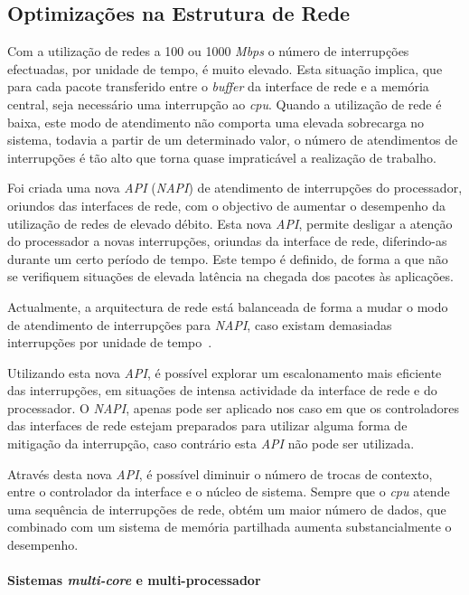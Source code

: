 \subsection{Optimizações na Estrutura de Rede}
\label{sub:napi}
Com a utilização de redes a 100 ou 1000 \textit{Mbps} o número de interrupções efectuadas, por unidade de tempo, é muito elevado.
Esta situação implica, que para cada pacote transferido entre o \textit{buffer} da interface de rede e a memória central, seja necessário uma interrupção ao \textit{cpu}.
Quando a utilização de rede é baixa, este modo de atendimento não comporta uma elevada sobrecarga no sistema, todavia a partir de um determinado valor, o número de atendimentos de interrupções é tão alto que torna quase impraticável a realização de trabalho.

Foi criada uma nova \textit{API} (\textit{NAPI}) de atendimento de interrupções do processador, oriundos das interfaces de rede, com o objectivo de aumentar o desempenho da utilização de redes de elevado débito.
Esta nova \textit{API}, permite desligar a atenção do processador a novas interrupções, oriundas da interface de rede, diferindo-as durante um certo período de tempo.
Este tempo é definido, de forma a que não se verifiquem situações de elevada latência na chegada dos pacotes às aplicações.

Actualmente, a arquitectura de rede está balanceada de forma a mudar o modo de atendimento de interrupções para \textit{NAPI}, caso existam demasiadas interrupções por unidade de tempo~\cite{administrator:napi}.

Utilizando esta nova \textit{API}, é possível explorar um escalonamento mais eficiente das interrupções, em situações de intensa actividade da interface de rede e do processador.
O \textit{NAPI}, apenas pode ser aplicado nos caso em que os controladores das interfaces de rede estejam preparados para utilizar alguma forma de mitigação da interrupção, caso contrário esta \textit{API} não pode ser utilizada.

Através desta nova \textit{API}, é possível diminuir o número de trocas de contexto, entre o controlador da interface e o núcleo de sistema.
Sempre que o \textit{cpu} atende uma sequência de interrupções de rede, obtém um maior número de dados, que combinado com um sistema de memória partilhada aumenta substancialmente o desempenho.

\paragraph*{Sistemas \textit{multi-core} e multi-processador}

